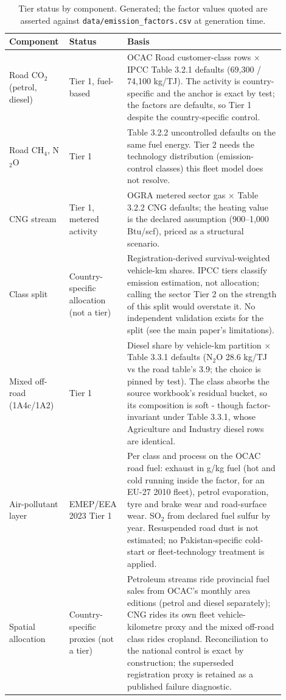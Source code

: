 \begin{table}[!htbp]
\centering
\scriptsize
\setlength{\tabcolsep}{3pt}
\begin{tabular}{@{}>{\raggedright\arraybackslash}p{0.17\linewidth}>{\raggedright\arraybackslash}p{0.18\linewidth}>{\raggedright\arraybackslash}p{0.55\linewidth}@{}}
\toprule
\textbf{Component} & \textbf{Status} & \textbf{Basis} \\
\midrule
Road CO$_2$ (petrol, diesel) & Tier 1, fuel-based & OCAC Road customer-class rows $\times$ IPCC Table 3.2.1 defaults (69,300 / 74,100 kg/TJ). The activity is country-specific and the anchor is exact by test; the factors are defaults, so Tier 1 despite the country-specific control. \\[2pt]
Road CH$_4$, N$_2$O & Tier 1 & Table 3.2.2 uncontrolled defaults on the same fuel energy. Tier 2 needs the technology distribution (emission-control classes) this fleet model does not resolve. \\[2pt]
CNG stream & Tier 1, metered activity & OGRA metered sector gas $\times$ Table 3.2.2 CNG defaults; the heating value is the declared assumption (900--1,000 Btu/scf), priced as a structural scenario. \\[2pt]
Class split & Country-specific allocation (not a tier) & Registration-derived survival-weighted vehicle-km shares. IPCC tiers classify emission estimation, not allocation; calling the sector Tier 2 on the strength of this split would overstate it. No independent validation exists for the split (see the main paper's limitations). \\[2pt]
Mixed off-road (1A4c/1A2) & Tier 1 & Diesel share by vehicle-km partition $\times$ Table 3.3.1 defaults (N$_2$O 28.6 kg/TJ vs the road table's 3.9; the choice is pinned by test). The class absorbs the source workbook's residual bucket, so its composition is soft - though factor-invariant under Table 3.3.1, whose Agriculture and Industry diesel rows are identical. \\[2pt]
Air-pollutant layer & EMEP/EEA 2023 Tier 1 & Per class and process on the OCAC road fuel: exhaust in g/kg fuel (hot and cold running inside the factor, for an EU-27 2010 fleet), petrol evaporation, tyre and brake wear and road-surface wear. SO$_2$ from declared fuel sulfur by year. Resuspended road dust is not estimated; no Pakistan-specific cold-start or fleet-technology treatment is applied. \\[2pt]
Spatial allocation & Country-specific proxies (not a tier) & Petroleum streams ride provincial fuel sales from OCAC's monthly area editions (petrol and diesel separately); CNG rides its own fleet vehicle-kilometre proxy and the mixed off-road class rides cropland. Reconciliation to the national control is exact by construction; the superseded registration proxy is retained as a published failure diagnostic. \\[2pt]
\bottomrule
\end{tabular}
\caption{Tier status by component. Generated; the factor values quoted are
asserted against \texttt{data/emission\_factors.csv} at generation time.}
\label{tab:tierstatus}
\end{table}
